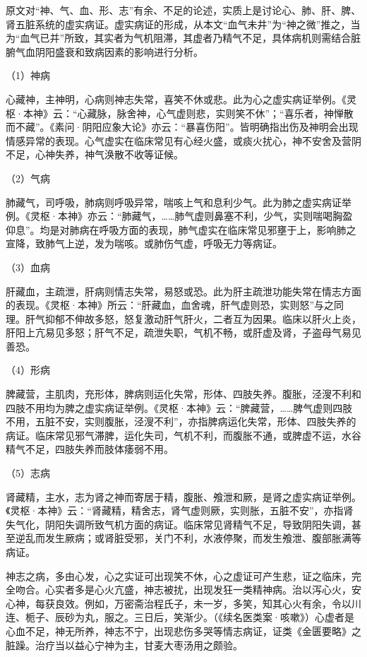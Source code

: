 \documentclass[draft,12pt]{ctexbook}
\begin{document}


原文对“神、气、血、形、志”有余、不足的论述，实质上是讨论心、肺、肝、脾、肾五脏系统的虚实病证。虚实病证的形成，从本文“血气未井”为“神之微”推之，当为“血气已并”所致，其实者为气机阻滞，其虚者乃精气不足，具体病机则需结合脏腑气血阴阳盛衰和致病因素的影响进行分析。

（1）神病

心藏神，主神明，心病则神志失常，喜笑不休或悲。此为心之虚实病证举例。《灵枢·本神》云：“心藏脉，脉舍神，心气虚则悲，实则笑不休”；“喜乐者，神惮散而不藏”。《素问·阴阳应象大论》亦云：“暴喜伤阳”。皆明确指出伤及神明会出现情感异常的表现。心气虚实在临床常见有心经火盛，或痰火扰心，神不安舍及营阴不足，心神失养，神气涣散不收等证候。

（2）气病

肺藏气，司呼吸，肺病则呼吸异常，喘咳上气和息利少气。此为肺之虚实病证举例。《灵枢·本神》亦云：“肺藏气，……肺气虚则鼻塞不利，少气，实则喘喝胸盈仰息”。均是对肺病在呼吸方面的表现，肺气虚实在临床常见邪壅于上，影响肺之宣降，致肺气上逆，发为喘咳。或肺伤气虚，呼吸无力等病证。

（3）血病

肝藏血，主疏泄，肝病则情志失常，易怒或恐。此为肝主疏泄功能失常在情志方面的表现。《灵枢·本神》所云：“肝藏血，血舍魂，肝气虚则恐，实则怒”与之同理。肝气抑郁不伸故多怒，怒复激动肝气肝火，二者互为因果。临床以肝火上炎，肝阳上亢易见多怒；肝气不足，疏泄失职，气机不畅，或肝虚及肾，子盗母气易见善恐。

（4）形病

脾藏营，主肌肉，充形体，脾病则运化失常，形体、四肢失养。腹胀，泾溲不利和四肢不用均为脾之虚实病证举例。《灵枢·本神》云：“脾藏营，……脾气虚则四肢不用，五脏不安，实则腹胀，泾溲不利”，亦指脾病运化失常，形体、四肢失养的病证。临床常见邪气滞脾，运化失司，气机不利，而腹胀不通，或脾虚不运，水谷精气不足，四肢失养而肢体痿弱不用。

（5）志病

肾藏精，主水，志为肾之神而寄居于精，腹胀、飧泄和厥，是肾之虚实病证举例。《灵枢·本神》云：“肾藏精，精舍志，肾气虚则厥，实则胀，五脏不安”，亦指肾失气化，阴阳失调所致气机方面的病证。临床常见肾精气不足，导致阴阳失调，甚至逆乱而发生厥病；或肾脏受邪，关门不利，水液停聚，而发生飧泄、腹部胀满等病证。



神志之病，多由心发，心之实证可出现笑不休，心之虚证可产生悲，证之临床，完全吻合。心实者多是心火亢盛，神志被扰，出现发狂一类精神病。治以泻心火，安心神，每获良效。例如，万密斋治程氏子，未一岁，多笑，知其心火有余，令以川连、栀子、辰砂为丸，服之。三日后，笑渐少。（《续名医类案·咳嗽》）心虚者是心血不足，神无所养，神志不宁，出现悲伤多哭等情志病证，证类《金匮要略》之脏躁。治疗当以益心宁神为主，甘麦大枣汤用之颇验。
\end{document}
